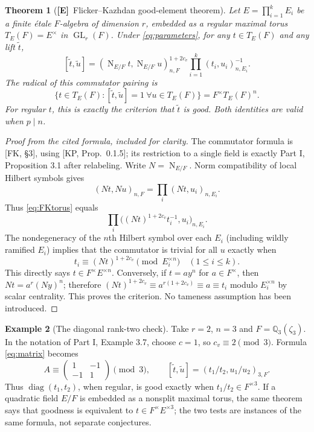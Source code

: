 \documentclass[11pt]{article}
\newcommand{\GL}{\operatorname{GL}}
\newcommand{\Nm}{\operatorname{N}}
\newcommand{\Etag}{\textnormal{\textbf{[E]}}}
\theoremstyle{plain}
\newtheorem{theorem}{Theorem}[section]
\theoremstyle{definition}
\newtheorem{example}[theorem]{Example}
\begin{document}
\begin{theorem}[\Etag\ Flicker--Kazhdan good-element theorem]\label{thm:FKgood}
Let $E=\prod_{i=1}^kE_i$ be a finite \emph{\'etale} $F$-algebra
of dimension $r$, embedded as a regular maximal torus
$T_E(F)=E^\times$ in $\GL_r(F)$.  Under \eqref{eq:parameters},
for any $t\in T_E(F)$ and any lift $\widetilde t$,
\begin{equation}\label{eq:FKtorus}
 [\widetilde t,\widetilde u]
 =(\Nm_{E/F}t,\Nm_{E/F}u)_{n,F}^{1+2c_v}
   \prod_{i=1}^k(t_i,u_i)_{n,E_i}^{-1}.
\end{equation}
The radical of this commutator pairing is
\begin{equation}\label{eq:everygood}
 \{t\in T_E(F):[\widetilde t,\widetilde u]=1\ \forall u\in T_E(F)\}
 =F^\times T_E(F)^n.
\end{equation}
For regular $t$, this is exactly the criterion that $\widetilde t$
is good.  Both identities are valid when $p\mid n$.
\end{theorem}
\begin{proof}[Proof from the cited formula, included for clarity]
The commutator formula is [FK, \S3], using [KP, Prop.~0.1.5];
its restriction to a single field is exactly Part I,
Proposition 3.1 after relabeling.  Write $N=\Nm_{E/F}$.
Norm compatibility of local Hilbert symbols gives
\[
 (Nt,Nu)_{n,F}
 =\prod_i(Nt,u_i)_{n,E_i}.
\]
Thus \eqref{eq:FKtorus} equals
\[
 \prod_i\bigl((Nt)^{1+2c_v}t_i^{-1},u_i\bigr)_{n,E_i}.
\]
The nondegeneracy of the $n$th Hilbert symbol over each $E_i$
(including wildly ramified $E_i$) implies that the commutator is
trivial for all $u$ exactly when
\begin{equation}\label{eq:pointwisegood}
 t_i\equiv(Nt)^{1+2c_v}\pmod{E_i^{\times n}}
 \quad (1\leq i\leq k).
\end{equation}
This directly says $t\in F^\times E^{\times n}$.  Conversely,
if $t=ay^n$ for $a\in F^\times$, then
$Nt=a^r(Ny)^n$; therefore
$(Nt)^{1+2c_v}\equiv a^{r(1+2c_v)}\equiv a\equiv t_i$
modulo $E_i^{\times n}$ by scalar centrality.  This proves the
criterion.  No tameness assumption has been introduced.
\end{proof}

\begin{example}[The diagonal rank-two check]\label{ex:diag}
Take $r=2$, $n=3$ and $F=\mathbb Q_3(\zeta_3)$.
In the notation of Part I, Example 3.7, choose $c=1$, so
$c_v\equiv2\pmod3$.  Formula \eqref{eq:matrix} becomes
\[
 A\equiv\begin{pmatrix}1&-1\\-1&1\end{pmatrix}\pmod3,
 \qquad
 [\widetilde t,\widetilde u]
 =(t_1/t_2,u_1/u_2)_{3,F}.
\]
Thus $\operatorname{diag}(t_1,t_2)$, when regular, is good exactly
when $t_1/t_2\in F^{\times3}$.  If a quadratic field $E/F$ is
embedded as a nonsplit maximal torus, the same theorem says that
goodness is equivalent to $t\in F^\times E^{\times3}$; the two
tests are instances of the same formula, not separate conjectures.
\end{example}
\end{document}
